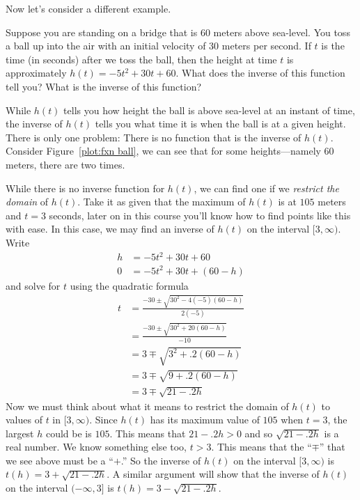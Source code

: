 Now let's consider a different example.

\begin{example}\label{E:example-ball-bridge}
Suppose you are standing on a bridge that is 60 meters above
sea-level. You toss a ball up into the air with an initial velocity of
30 meters per second.  If $t$ is the time (in seconds) after we toss
the ball, then the height at time $t$ is approximately $h(t) = -5 t^2
+30t+60$. What does the inverse of this function tell you? What is the inverse
of this function?
\end{example}


\begin{solution}
While $h(t)$ tells you how height the ball is above sea-level at an
instant of time, the inverse of $h(t)$ tells you what time it is when
the ball is at a given height. There is only one problem: There is no
function that is the inverse of $h(t)$. Consider Figure~\ref{plot:fxn
  ball}, we can see that for some heights---namely 60 meters, there
are two times. 

While there is no inverse function for $h(t)$, we can find one if we
\textit{restrict the domain} of $h(t)$. Take it as given that the
maximum of $h(t)$ is at $105$ meters and $t=3$ seconds, later on in
this course you'll know how to find points like this with ease. In
this case, we may find an inverse of $h(t)$ on the interval
$[3,\infty)$. Write
\begin{align*}
h &=  -5 t^2 +30t+60\\
0 &= -5 t^2 +30t+(60 - h)
\end{align*}
and solve for $t$ using the quadratic formula
\begin{align*}
t &= \frac{-30\pm \sqrt{30^2 -4(-5)(60-h)}}{2(-5)}\\
&= \frac{-30\pm \sqrt{30^2 +20(60-h)}}{-10}\\
&=3\mp \sqrt{3^2+ .2(60-h)}\\
&=3\mp \sqrt{9+ .2(60-h)}\\
&=3\mp \sqrt{21-.2h}
\end{align*}
Now we must think about what it means to restrict the domain of $h(t)$
to values of $t$ in $[3,\infty)$. Since $h(t)$ has its maximum value
  of $105$ when $t=3$, the largest $h$ could be is $105$. This means
  that $21-.2h >0$ and so $\sqrt{21-.2h}$ is a real number. We know
  something else too, $t>3$. This means that the ``$\mp$'' that we see
  above must be a ``$+$.''  So the inverse of $h(t)$ on the interval
  $[3,\infty)$ is $t(h) = 3+ \sqrt{21-.2h}$. A similar argument will
    show that the inverse of $h(t)$ on the interval $(-\infty, 3]$ is
  $t(h) = 3- \sqrt{21-.2h}$.
\end{solution}

